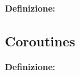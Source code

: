 \textsf{\small \textbf{Definizione: } } \\

\newpage

\subsection{Coroutines}


\textsf{\small \textbf{Definizione: } } \\

